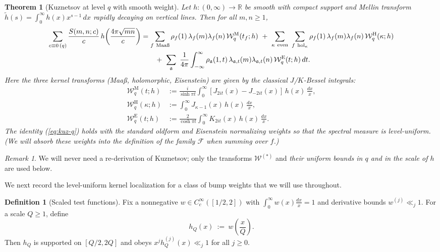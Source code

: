 \documentclass[11pt]{article}
\def\eqref#1{(\ref{#1})}%
\newtheorem{theorem}[lemma]{Theorem}
\theoremstyle{definition}
\newtheorem{definition}[lemma]{Definition}
\theoremstyle{remark}
\newtheorem{remark}[lemma]{Remark}
\numberwithin{equation}{part}
\begin{document}
\begin{theorem}[Kuznetsov at level $q$ with smooth weight]\label{thm:kuz-levelq}
	Let $h:(0,\infty)\to\mathbb R$ be smooth with compact support and Mellin transform $\widetilde h(s)=\int_0^\infty h(x)x^{s-1}\,dx$ rapidly decaying on vertical lines. Then for all $m,n\ge1$,
	\begin{align}
		\sum_{c\equiv 0\,(q)} \frac{S(m,n;c)}{c}\,h\!\left(\frac{4\pi\sqrt{mn}}{c}\right)
		 & = \sum_{f\ \mathrm{Maa\text\ss}} \rho_f(1)\,\lambda_f(m)\lambda_f(n)\,\mathcal W_q^{\mathrm{M}}(t_f;h)
		\ +\ \sum_{\kappa\ \mathrm{even}}\ \sum_{f\ \mathrm{hol}_\kappa} \rho_f(1)\,\lambda_f(m)\lambda_f(n)\,\mathcal W_q^{\mathrm{H}}(\kappa;h) \notag                                         \\
		 & \qquad+\ \sum_{\mathfrak a}\ \frac{1}{4\pi}\int_{-\infty}^{\infty} \rho_{\mathfrak a}(1,t)\,\lambda_{\mathfrak a,t}(m)\lambda_{\mathfrak a,t}(n)\,\mathcal W_q^{\mathrm{E}}(t;h)\,dt.
		\label{eq:kuz-q}
	\end{align}
	Here the three kernel transforms (Maa\ss, holomorphic, Eisenstein) are given by the classical $J$/$K$-Bessel integrals:
	\begin{align*}
		\mathcal W_q^{\mathrm{M}}(t;h)
		 & := \frac{i}{\sinh \pi t}\int_0^\infty \left[J_{2it}(x)-J_{-2it}(x)\right]\,h(x)\,\frac{dx}{x}, \\
		\mathcal W_q^{\mathrm{H}}(\kappa;h)
		 & := \int_0^\infty J_{\kappa-1}(x)\,h(x)\,\frac{dx}{x},                                          \\
		\mathcal W_q^{\mathrm{E}}(t;h)
		 & := \frac{2}{\cosh \pi t}\int_0^\infty K_{2it}(x)\,h(x)\,\frac{dx}{x}.
	\end{align*}
	The identity \eqref{eq:kuz-q} holds with the standard oldform and Eisenstein normalizing weights so that the spectral measure is level-uniform. (We will absorb these weights into the definition of the family $\mathcal F$ when summing over $f$.)
\end{theorem}

\begin{remark}
	We will never need a re-derivation of Kuznetsov; only the transforms $\mathcal W^{(*)}$ and \emph{their uniform bounds in $q$ and in the scale of $h$} are used below.
\end{remark}

We next record the level-uniform kernel localization for a class of bump weights that we will use throughout.

\begin{definition}[Scaled test functions]\label{def:scaled-hQ}
	Fix a nonnegative $w\in C_c^\infty([1/2,2])$ with $\int_0^\infty w(x)\frac{dx}{x}=1$ and derivative bounds $w^{(j)}\ll_j 1$. For a scale $Q\ge1$, define
	\[
		h_Q(x)\ :=\ w\!\left(\frac{x}{Q}\right).
	\]
	Then $h_Q$ is supported on $[Q/2,2Q]$ and obeys $x^j h_Q^{(j)}(x)\ll_j 1$ for all $j\ge0$.
\end{definition}
\end{document}
